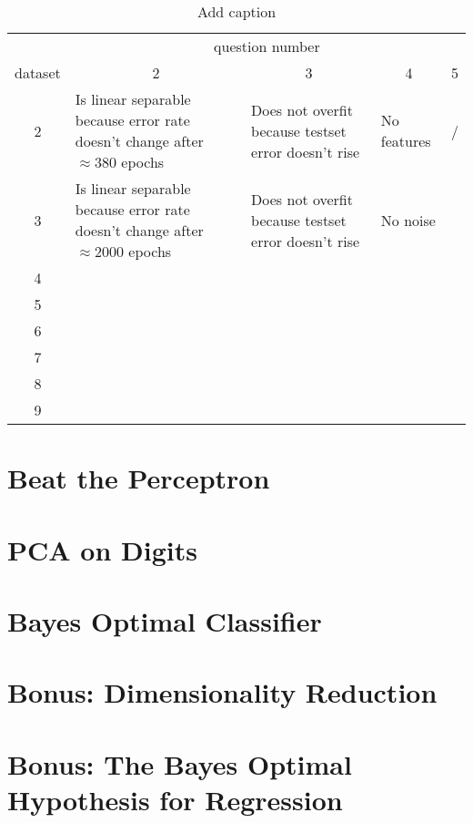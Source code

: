 \documentclass[12pt]{article}
\begin{document}
\begin{table}[htbp]
	\centering
	\caption{Add caption}
	\begin{tabularx}{\textwidth}{c|X|X|X|X|}
		& \multicolumn{4}{c|}{question number} \\
		dataset & \multicolumn{1}{c}{2} & \multicolumn{1}{c}{3} & \multicolumn{1}{c}{4} & \multicolumn{1}{c|}{5} \\
		\midrule
		2     &   Is linear separable because error rate doesn't change after $\approx 380$ epochs  &  Does not overfit because testset error doesn't rise     &   No features    & / \\
		\midrule
		3     &   Is linear separable because error rate doesn't change after $\approx 2000$ epochs    &    Does not overfit because testset error doesn't rise   &   No noise    &  \\
		\midrule
		4     &       &       &       &  \\
		\midrule
		5     &       &       &       &  \\
		\midrule
		6     &       &       &       &  \\
		\midrule
		7     &       &       &       &  \\
		\midrule
		8     &       &       &       &  \\
		\midrule
		9     &       &       &       &  \\
		\bottomrule
	\end{tabularx}%
	\label{tab:addlabel}%
\end{table}%



\section{Beat the Perceptron}
 

\section{PCA on Digits}



\section{Bayes Optimal Classifier}


\section{Bonus: Dimensionality Reduction}


\section{Bonus: The Bayes Optimal Hypothesis for Regression}



%
%
\end{document}
